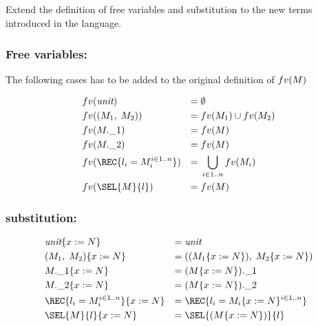 \subsection{}

Extend the definition of free variables and substitution to the new terms introduced in the
language.

\subsubsection*{Free variables:}

The following cases has to be added to the original definition of $fv(M)$

\begin{align*}
	 & \fv{\unit}                       & =\; & \emptyset                     \\
	 & \fv{\PAIR{M_1}{M_2}}             & =\; & \fv{M_1} \cup \fv{M_2}        \\
	 & \fv{\FST{M}}                     & =\; & \fv{M}                        \\
	 & \fv{\SND{M}}                     & =\; & \fv{M}                        \\
	 & \fv{\REC{l_i = M_i^{i\in 1..n}}} & =\; & \bigcup_{i \in 1..n} \fv{M_i} \\
	 & \fv{\SEL{M}{l}}                  & =\; & \fv{M}
\end{align*}

\subsubsection*{substitution:}

\begin{align*}
	 & \unit\SUBST{x}{N}                       & =\; & \unit                                     \\
	 & \PAIR{M_1}{M_2}\SUBST{x}{N}             & =\; & \PAIR{(M_1\SUBST{x}{N})}{M_2\SUBST{x}{N}} \\
	 & \FST{M}\SUBST{x}{N}                     & =\; & \FST{(M\SUBST{x}{N})}                     \\
	 & \SND{M}\SUBST{x}{N}                     & =\; & \SND{(M\SUBST{x}{N})}                     \\
	 & \REC{l_i = M_i^{i\in 1..n}}\SUBST{x}{N} & =\; & \REC{l_i = M_i\SUBST{x}{N}^{i\in 1..n}}   \\
	 & \SEL{M}{l}\SUBST{x}{N}                  & =\; & \SEL{(M\SUBST{x}{N})}{l}
\end{align*}
